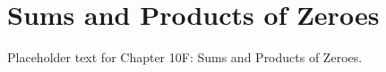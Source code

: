 \section{Sums and Products of Zeroes}
Placeholder text for Chapter 10F: Sums and Products of Zeroes.

